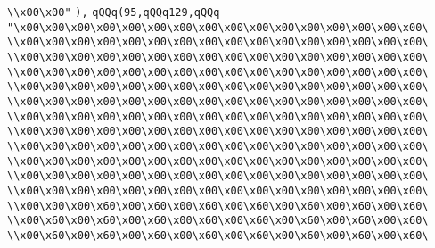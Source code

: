 \verb|\\x00\x00"|\newline
\verb|),|\newline
\verb|qQQq(95,qQQq129,qQQq|\newline
\verb|"\x00\x00\x00\x00\x00\x00\x00\x00\x00\x00\x00\x00\x00\x00\x00\x00\|\newline
\verb|\\x00\x00\x00\x00\x00\x00\x00\x00\x00\x00\x00\x00\x00\x00\x00\x00\|\newline
\verb|\\x00\x00\x00\x00\x00\x00\x00\x00\x00\x00\x00\x00\x00\x00\x00\x00\|\newline
\verb|\\x00\x00\x00\x00\x00\x00\x00\x00\x00\x00\x00\x00\x00\x00\x00\x00\|\newline
\verb|\\x00\x00\x00\x00\x00\x00\x00\x00\x00\x00\x00\x00\x00\x00\x00\x00\|\newline
\verb|\\x00\x00\x00\x00\x00\x00\x00\x00\x00\x00\x00\x00\x00\x00\x00\x00\|\newline
\verb|\\x00\x00\x00\x00\x00\x00\x00\x00\x00\x00\x00\x00\x00\x00\x00\x00\|\newline
\verb|\\x00\x00\x00\x00\x00\x00\x00\x00\x00\x00\x00\x00\x00\x00\x00\x00\|\newline
\verb|\\x00\x00\x00\x00\x00\x00\x00\x00\x00\x00\x00\x00\x00\x00\x00\x00\|\newline
\verb|\\x00\x00\x00\x00\x00\x00\x00\x00\x00\x00\x00\x00\x00\x00\x00\x00\|\newline
\verb|\\x00\x00\x00\x00\x00\x00\x00\x00\x00\x00\x00\x00\x00\x00\x00\x00\|\newline
\verb|\\x00\x00\x00\x00\x00\x00\x00\x00\x00\x00\x00\x00\x00\x00\x00\x00\|\newline
\verb|\\x00\x00\x00\x60\x00\x60\x00\x60\x00\x60\x00\x60\x00\x60\x00\x60\|\newline
\verb|\\x00\x60\x00\x60\x00\x60\x00\x60\x00\x60\x00\x60\x00\x60\x00\x60\|\newline
\verb|\\x00\x60\x00\x60\x00\x60\x00\x60\x00\x60\x00\x60\x00\x60\x00\x60\|\newline
